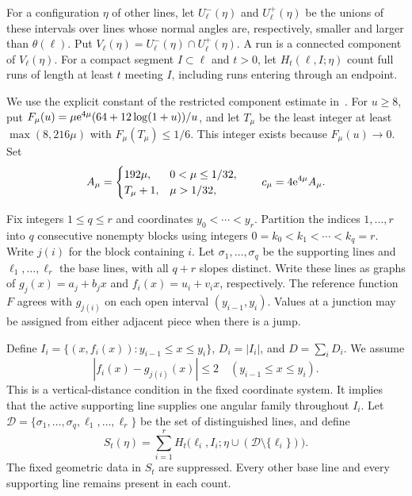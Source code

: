 \documentclass[11pt,letterpaper]{article}
\begin{document}
For a configuration $\eta$ of other lines, let $U_\ell^-(\eta)$ and $U_\ell^+(\eta)$ be the unions of these intervals over lines whose normal angles are, respectively, smaller and larger than $\theta(\ell)$. Put $V_\ell(\eta)=U_\ell^-(\eta)\cap U_\ell^+(\eta)$. A run is a connected component of $V_\ell(\eta)$. For a compact segment $I\subset\ell$ and $t>0$, let $H_t(\ell,I;\eta)$ count full runs of length at least $t$ meeting $I$, including runs entering through an endpoint.

We use the explicit constant of the restricted component estimate in~\cite{ORC26}. For $u\ge8$, put $F_\mu(u)=\mu\mathrm{e}^{4\mu}(64+12\log(1+u))/u$, and let $T_\mu$ be the least integer at least $\max(8,216\mu)$ with $F_\mu(T_\mu)\le1/6$. This integer exists because $F_\mu(u)\to0$. Set
\[
 A_\mu=\begin{cases}192\mu,&0<\mu\le1/32,\\T_\mu+1,&\mu>1/32,\end{cases}
 \qquad c_\mu=4\mathrm{e}^{4\mu}A_\mu.
\]

Fix integers $1\le q\le r$ and coordinates $y_0<\cdots<y_r$. Partition the indices $1,\ldots,r$ into $q$ consecutive nonempty blocks using integers $0=k_0<k_1<\cdots<k_q=r$. Write $j(i)$ for the block containing $i$. Let $\sigma_1,\ldots,\sigma_q$ be the supporting lines and $\ell_1,\ldots,\ell_r$ the base lines, with all $q+r$ slopes distinct. Write these lines as graphs of $g_j(x)=a_j+b_jx$ and $f_i(x)=u_i+v_ix$, respectively. The reference function $F$ agrees with $g_{j(i)}$ on each open interval $(y_{i-1},y_i)$. Values at a junction may be assigned from either adjacent piece when there is a jump.

Define $I_i=\{(x,f_i(x)):y_{i-1}\le x\le y_i\}$, $D_i=|I_i|$, and $D=\sum_iD_i$. We assume
\begin{equation}\label{eq:close}
 |f_i(x)-g_{j(i)}(x)|\le2\quad(y_{i-1}\le x\le y_i).
\end{equation}
This is a vertical-distance condition in the fixed coordinate system. It implies that the active supporting line supplies one angular family throughout $I_i$. Let $\mathcal D=\{\sigma_1,\ldots,\sigma_q,\ell_1,\ldots,\ell_r\}$ be the set of distinguished lines, and define
\begin{equation}\label{eq:S}
 S_t(\eta)=\sum_{i=1}^rH_t\big(\ell_i,I_i;\eta\cup(\mathcal D\setminus\{\ell_i\})\big).
\end{equation}
The fixed geometric data in $S_t$ are suppressed. Every other base line and every supporting line remains present in each count.
\end{document}

